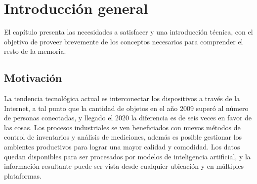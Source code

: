 
\chapter{Introducción general} %

\label{Chapter1} %
\label{IntroGeneral}


\newcommand{\keyword}[1]{\textbf{#1}}
\newcommand{\tabhead}[1]{\textbf{#1}}
\newcommand{\code}[1]{\texttt{#1}}
\newcommand{\file}[1]{\texttt{\bfseries#1}}
\newcommand{\option}[1]{\texttt{\itshape#1}}
\newcommand{\grados}{$^{\circ}$}



El capítulo presenta las necesidades a satisfacer y una introducción técnica, con el objetivo de proveer brevemente de los conceptos necesarios para comprender el resto de la memoria.

\section{Motivación}
\label{ch1Motivacion}

La tendencia tecnológica actual es interconectar los dispositivos a través de la Internet, a tal punto que la cantidad de objetos en el año 2009 superó al número de personas conectadas, y llegado el 2020 la diferencia es de seis veces en favor de las cosas.
Los procesos industriales se ven beneficiados con nuevos métodos de control de inventarios y análisis de mediciones, además es posible gestionar los ambientes productivos para lograr una mayor calidad y comodidad.
Los datos quedan disponibles para ser procesados por modelos de inteligencia artificial, y la información resultante puede ser vista desde cualquier ubicación y en múltiples plataformas. 

